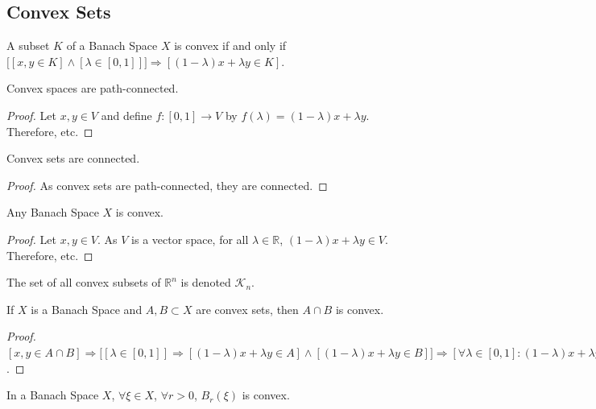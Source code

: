 \documentclass[crop=false,class=book,oneside]{standalone}
\begin{document}
        \subsection{Convex Sets}
            \begin{definition}
            A subset $K$ of a Banach Space $X$ is convex if and only if $\big[[x,y\in K]\land  [\lambda \in [0,1]]\big]\Rightarrow[(1-\lambda)x+\lambda y\in K]$.
            \end{definition}
            \begin{theorem}
            Convex spaces are path-connected.
            \end{theorem}
            \begin{proof}
            Let $x,y\in V$ and define $f:[0,1]\rightarrow V$ by $f(\lambda) = (1-\lambda)x+\lambda y$. Therefore, etc.
            \end{proof}
            \begin{corollary}
            Convex sets are connected.
            \end{corollary}
            \begin{proof}
            As convex sets are path-connected, they are connected.
            \end{proof}
            \begin{theorem}
            Any Banach Space $X$ is convex.
            \end{theorem}
            \begin{proof}
            Let $x,y\in V$. As $V$ is a vector space, for all $\lambda \in \mathbb{R}$, $(1-\lambda)x+\lambda y\in V$. Therefore, etc.
            \end{proof}
            \begin{notation}
            The set of all convex subsets of $\mathbb{R}^n$ is denoted $\mathscr{K}_n$.
            \end{notation}
            \begin{theorem}
            If $X$ is a Banach Space and $A,B\subset X$ are convex sets, then $A\cap B$ is convex.
            \end{theorem}
            \begin{proof}
            $[x,y \in A\cap B] \Rightarrow \big[[\lambda \in [0,1]]\Rightarrow[ (1-\lambda)x+\lambda y \in A]\land [ (1-\lambda)x+\lambda y \in B]\big] \Rightarrow [\forall \lambda \in [0,1]:(1-\lambda)x+\lambda y \in A\cap B]$. 
            \end{proof}
            \begin{lemma}
            In a Banach Space $X$, $\forall \xi \in X$, $\forall r>0$, $B_{r}(\xi)$ is convex.
            \end{lemma}
\end{document}
